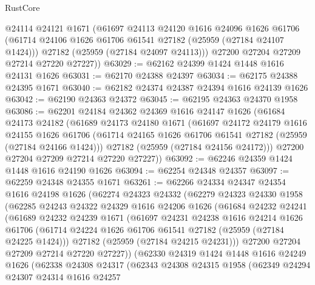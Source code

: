 \begin{lexlean}{RustCore}
\begin{coremodule}
        @24114
        @24121
        @1671
        (@61697
          @24113
          @24120
          @1616
          @24096
          @1626
          @61706
          (@61714 @24106 @1626 @61706 @61541 @27182 (@25959 (@27184 @24107 @1424)))
          @27182
          (@25959 (@27184 @24097 @24113)))
        @27200
        @27204
        @27209
        @27214
        @27220
        @27227))
@63029 := @62162 @24399 @1424 @1448 @1616 @24131 @1626
@63031 := @62170 @24388 @24397
@63034 := @62175 @24388 @24395 @1671
@63040 := @62182 @24374 @24387 @24394 @1616 @24139 @1626
@63042 := @62190 @24363 @24372
@63045 := @62195 @24363 @24370 @1958
@63086 := @62201
    @24184
    @24362
    @24369
    @1616
    @24147
    @1626
    (@61684
      @24173
      @24182
      (@61689
        @24173
        @24180
        @1671
        (@61697
          @24172
          @24179
          @1616
          @24155
          @1626
          @61706
          (@61714 @24165 @1626 @61706 @61541 @27182 (@25959 (@27184 @24166 @1424)))
          @27182
          (@25959 (@27184 @24156 @24172)))
        @27200
        @27204
        @27209
        @27214
        @27220
        @27227))
@63092 := @62246 @24359 @1424 @1448 @1616 @24190 @1626
@63094 := @62254 @24348 @24357
@63097 := @62259 @24348 @24355 @1671
@63261 := @62266
    @24334
    @24347
    @24354
    @1616
    @24198
    @1626
    (@62274
      @24323
      @24332
      (@62279
        @24323
        @24330
        @1958
        (@62285
          @24243
          @24322
          @24329
          @1616
          @24206
          @1626
          (@61684
            @24232
            @24241
            (@61689
              @24232
              @24239
              @1671
              (@61697
                @24231
                @24238
                @1616
                @24214
                @1626
                @61706
                (@61714 @24224 @1626 @61706 @61541 @27182 (@25959 (@27184 @24225 @1424)))
                @27182
                (@25959 (@27184 @24215 @24231)))
              @27200
              @27204
              @27209
              @27214
              @27220
              @27227))
          (@62330
            @24319
            @1424
            @1448
            @1616
            @24249
            @1626
            (@62338
              @24308
              @24317
              (@62343
                @24308
                @24315
                @1958
                (@62349
                  @24294
                  @24307
                  @24314
                  @1616
                  @24257

\end{coremodule}
\end{lexlean}
